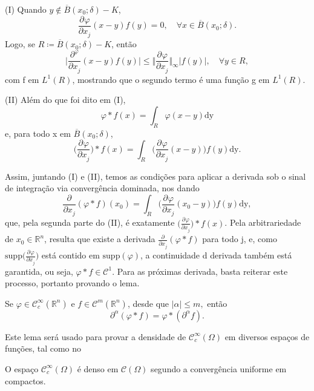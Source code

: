 \documentclass[../distribution_theory_notes.tex]{subfiles}
\begin{document}
\begin{proof*}
	(I) Quando \(y\not\in \overline{B}(x_{0}; \delta  )-K\),
	\[
		\frac{\partial^{}\varphi }{\partial x_{j}^{}}(x-y)f(y)=0,\quad \forall x\in \overline{B}(x_{0}; \delta ).
	\]
	Logo, se \(R\coloneqq \overline{B}(x_{0}; \delta )-K\), então
	\[
		\biggl\vert \frac{\partial^{\varphi }}{\partial x_{j}^{}}(x-y)f(y) \biggr\vert \leq \biggl\Vert \frac{\partial^{}\varphi }{\partial x_{j}^{}} \biggr\Vert_{\infty}|f(y)|,\quad \forall y\in R,
	\]
	com f em \(L^{1}(R)\), mostrando que o segundo termo é uma função g em \(L^{1}(R)\).

	(II) Além do que foi dito em (I),
	\[
		\varphi *f(x)=\int_{R}^{}\varphi (x-y) \mathrm{dy}
	\]
	e, para todo x em \(\overline{B}(x_{0}; \delta )\),
	\[
		\biggl(\frac{\partial^{}\varphi }{\partial x_{j}^{}}\biggr)* f(x) = \int_{R}^{}\biggl(\frac{\partial^{}\varphi }{\partial x_{j}^{}}(x-y)\biggr)f(y) \mathrm{dy}.
	\]

	Assim, juntando (I) e (II), temos as condições para aplicar a derivada sob o sinal de integração via convergência dominada, nos dando
	\[
		\frac{\partial^{}}{\partial x_{j}^{}}(\varphi *f)(x_{0})=\int_{R}^{}\biggl(\frac{\partial^{}\varphi }{\partial x_{j}^{}}(x_{0}-y)\biggr)f(y) \mathrm{dy},
	\]
	que, pela segunda parte do (II), é exatamente \(\biggl(\frac{\partial^{}\varphi }{\partial x_{j}^{}}\biggr)* f(x)\). Pela arbitrariedade de \(x_{0}\in \mathbb{R}^{n}\), resulta que existe a derivada \(\frac{\partial^{}}{\partial x_{j}^{}}(\varphi *f)\) para todo j, e, como \(\mathrm{supp}\biggl(\frac{\partial^{}\varphi }{\partial x_{j}^{}}\biggr)\) está contido em \(\mathrm{supp}(\varphi )\), a continuidade d derivada também está garantida, ou seja, \(\varphi *f\in \mathcal{C}^{1}\). Para as próximas derivada, basta reiterar este processo, portanto provando o lema. \qedsymbol

\end{proof*}
\begin{tcolorbox}[
		skin=enhanced,
		title=Observação,
		fonttitle=\bfseries,
		colframe=black,
		colbacktitle=cyan!75!white,
		colback=cyan!15,
		colbacklower=black,
		coltitle=black,
		drop fuzzy shadow,
	]
	Se \(\varphi \in \mathcal{C}_{c}^{\infty}(\mathbb{R}^{n})\) e \(f\in \mathcal{C}^{m}(\mathbb{R}^{n})\), desde que \(|\alpha |\leq m,\) então
	\[
		\partial^{\alpha }(\varphi*f)=\varphi *(\partial^{\alpha }f).
	\]
\end{tcolorbox}

Este lema será usado para provar a densidade de \(\mathcal{C}_{c}^{\infty}(\Omega )\) em diversos espaços de funções, tal como no
\begin{theorem*}
	O espaço \(\mathcal{C}_{c}^{\infty}(\Omega )\) é denso em \(\mathcal{C}(\Omega )\) segundo a convergência uniforme em compactos.
\end{theorem*}
\end{document}
